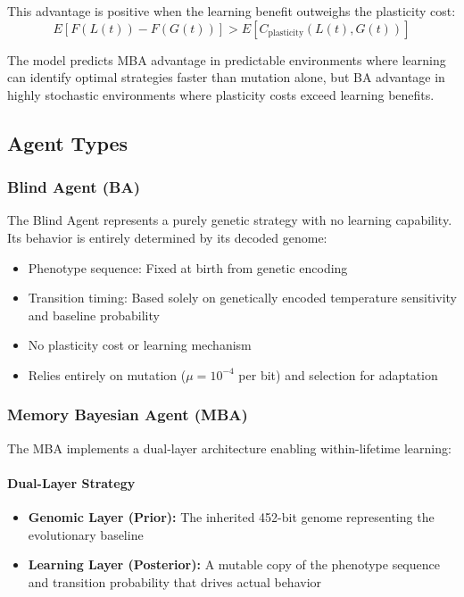 \documentclass[aps,pre,twocolumn,floatfix,nofootinbib,amsmath,amssymb]{revtex4-2}
\begin{document}
This advantage is positive when the learning benefit outweighs the plasticity cost:
\begin{equation}
E[F(L(t)) - F(G(t))] > E[C_{\text{plasticity}}(L(t), G(t))]
\end{equation}

The model predicts MBA advantage in predictable environments where learning can identify optimal strategies faster than mutation alone, but BA advantage in highly stochastic environments where plasticity costs exceed learning benefits.

\subsection{Agent Types}

\subsubsection{Blind Agent (BA)}

The Blind Agent represents a purely genetic strategy with no learning capability. Its behavior is entirely determined by its decoded genome:
\begin{itemize}
\item Phenotype sequence: Fixed at birth from genetic encoding
\item Transition timing: Based solely on genetically encoded temperature sensitivity and baseline probability
\item No plasticity cost or learning mechanism
\item Relies entirely on mutation ($\mu = 10^{-4}$ per bit) and selection for adaptation
\end{itemize}

\subsubsection{Memory Bayesian Agent (MBA)}

The MBA implements a dual-layer architecture enabling within-lifetime learning:

\paragraph{Dual-Layer Strategy}
\begin{itemize}
\item \textbf{Genomic Layer (Prior):} The inherited 452-bit genome representing the evolutionary baseline
\item \textbf{Learning Layer (Posterior):} A mutable copy of the phenotype sequence and transition probability that drives actual behavior
\end{itemize}
\end{document}
